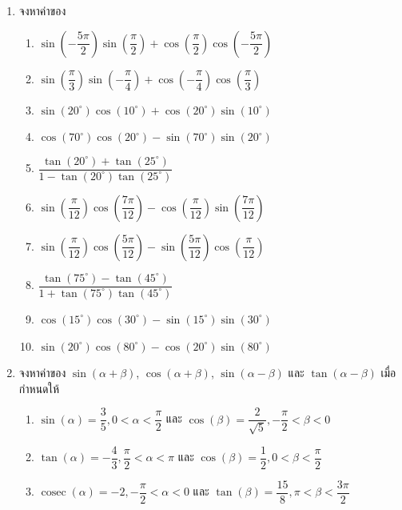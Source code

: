 \begin{enumerate}[label=\arabic*., leftmargin=*, itemsep=1em]
	\item จงหาค่าของ
	\begin{enumerate}[label=\theenumi\arabic*), leftmargin=1.5em, itemsep=0.6em]
		\everymath{\displaystyle}
		\item $\sin \left( -\dfrac{5\pi}{2} \right) \sin \left( \dfrac{\pi}{2} \right) + \cos \left( \dfrac{\pi}{2} \right) \cos \left( -\dfrac{5\pi}{2} \right)$
		\item $\sin \left( \dfrac{\pi}{3} \right) \sin \left( -\dfrac{\pi}{4} \right) + \cos \left( -\dfrac{\pi}{4} \right) \cos \left( \dfrac{\pi}{3} \right)$
		\item $\sin \left( 20^{\circ} \right) \cos \left( 10^{\circ} \right) + \cos \left( 20^{\circ} \right) \sin \left( 10^{\circ} \right)$
		\item $\cos \left( 70^{\circ} \right) \cos \left( 20^{\circ} \right) - \sin \left( 70^{\circ} \right) \sin \left( 20^{\circ} \right)$
		\item $\dfrac{\tan \left( 20^{\circ} \right) + \tan \left( 25^{\circ} \right)}{1 - \tan \left( 20^{\circ} \right) \tan \left( 25^{\circ} \right)}$
		\item $\sin \left( \dfrac{\pi}{12} \right) \cos \left( \dfrac{7\pi}{12} \right) - \cos \left( \dfrac{\pi}{12} \right) \sin \left( \dfrac{7\pi}{12} \right)$
		\item $\sin \left( \dfrac{\pi}{12} \right) \cos \left( \dfrac{5\pi}{12} \right) - \sin \left( \dfrac{5\pi}{12} \right) \cos \left( \dfrac{\pi}{12} \right)$
		\item $\dfrac{\tan \left( 75^{\circ} \right) - \tan \left( 45^{\circ} \right)}{1 + \tan \left( 75^{\circ} \right) \tan \left( 45^{\circ} \right)}$
		\item $\cos \left( 15^{\circ} \right) \cos \left( 30^{\circ} \right) - \sin \left( 15^{\circ} \right) \sin \left( 30^{\circ} \right)$
		\item $\sin \left( 20^{\circ} \right) \cos \left( 80^{\circ} \right) - \cos \left( 20^{\circ} \right) \sin \left( 80^{\circ} \right)$
	\end{enumerate}
	
	\item จงหาค่าของ $\sin \left( \alpha + \beta \right)$, $\cos \left( \alpha + \beta \right)$, $\sin \left( \alpha - \beta \right)$ และ $\tan \left( \alpha - \beta \right)$ เมื่อกำหนดให้
	\begin{enumerate}[label=\theenumi\arabic*), leftmargin=1.5em, itemsep=0.6em]
		\everymath{\displaystyle}
		\item $\sin \left( \alpha \right) = \dfrac{3}{5}, 0 < \alpha < \dfrac{\pi}{2}$ และ $\cos \left( \beta \right) = \dfrac{2}{\sqrt{5}}, -\dfrac{\pi}{2} < \beta < 0$
		\item $\tan \left( \alpha \right) = -\dfrac{4}{3}, \dfrac{\pi}{2} < \alpha < \pi$ และ $\cos \left( \beta \right) = \dfrac{1}{2}, 0 < \beta < \dfrac{\pi}{2}$
		\item $\operatorname{cosec} \left( \alpha \right) = -2, -\dfrac{\pi}{2} < \alpha < 0$ และ $\tan \left( \beta \right) = \dfrac{15}{8}, \pi < \beta < \dfrac{3\pi}{2}$
	\end{enumerate}
	

\end{enumerate}
